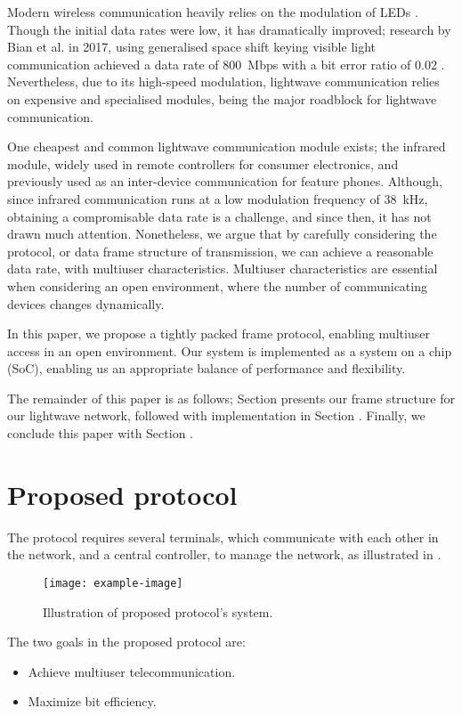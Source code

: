 ﻿\documentclass[twocolumn,9pt]{ltjsarticle}
\renewcommand{\ref}{\Cref}
\begin{document}
Modern wireless communication heavily relies on the modulation of LEDs \cite{nakagawa2004}.
Though the initial data rates were low, it has dramatically improved;
research by Bian et al. in 2017, using generalised space shift keying visible light communication achieved a data rate of \SI{800}{Mbps} with a bit error ratio of 0.02 \cite{Bian2017}.
Nevertheless, due to its high-speed modulation, lightwave communication relies on expensive and specialised modules, being the major roadblock for lightwave communication.

One cheapest and common lightwave communication module exists; the infrared module, widely used in remote controllers for consumer electronics, and previously used as an inter-device communication for feature phones.
Although, since infrared communication runs at a low modulation frequency of \SI{38}{kHz}, obtaining a compromisable data rate is a challenge, and since then, it has not drawn much attention.
Nonetheless, we argue that by carefully considering the protocol, or data frame structure of transmission, we can achieve a reasonable data rate, with multiuser characteristics.
Multiuser characteristics are essential when considering an open environment, where the number of communicating devices changes dynamically.

In this paper, we propose a tightly packed frame protocol, enabling multiuser access in an open environment.
Our system is implemented as a system on a chip (SoC), enabling us an appropriate balance of performance and flexibility.

The remainder of this paper is as follows;
Section \ref{sec:prp} presents our frame structure for our lightwave network, followed with implementation in Section \ref{sec:impl}.
Finally, we conclude this paper with Section \ref{sec:cncl}.

\section{Proposed protocol}
The protocol requires several terminals, which communicate with each other in the network, and a central controller, to manage the network, as illustrated in \ref{fig:overview}.

\begin{figure}[tb]
  \centering
  \texttt{[image: example-image]}
  \caption{\label{fig:overview}
    Illustration of proposed protocol's system.
  }
\end{figure}

The two goals in the proposed protocol are:
\begin{itemize}
\item Achieve multiuser telecommunication.
\item Maximize bit efficiency.
\end{itemize}
\end{document}
